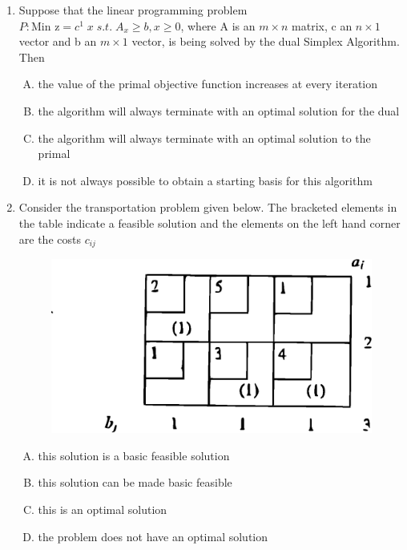 \documentclass[journal,12pt,twocolumn]{IEEEtran}
\begin{document}
\begin{enumerate}
\item Suppose that the linear programming problem $P:\text{Min z} = c^1 \; x \; s.t. \; A_x \! \geqslant \! b,x \! \geqslant \! 0$, where A is an $m \times n$ matrix, c an $n \times 1$ vector and b an $m \times 1$ vector, is being solved by the dual Simplex Algorithm. Then \\

\begin{enumerate}[(A)]
\setlength\itemsep{1em}

\item the value of the primal objective function increases at every iteration
\item the algorithm will always terminate with an optimal solution for the dual
\item the algorithm will always terminate with an optimal solution to the primal
\item it is not always possible to obtain a starting basis for this algorithm
\end{enumerate}

\item Consider the transportation problem given below. The bracketed elements in the table indicate a feasible solution and the elements on the left hand corner are the costs $c_{ij}$ 
\begin{figure}[!h]
\includegraphics[width=\columnwidth]{figure1.eps}
\label{fig:figure1}
\end{figure}
%
\begin{enumerate}[(A)]
\setlength\itemsep{1em}

\item this solution is a basic feasible solution
\item this solution can be made basic feasible
\item this is an optimal solution
\item the problem does not have an optimal solution


\end{enumerate}
\end{enumerate}
\end{document}
